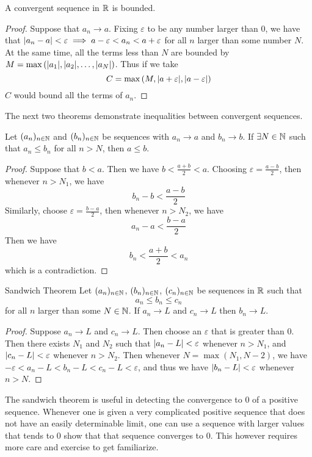 \documentclass[a4paper]{article}
\begin{document}
\begin{prp}{}{} A convergent sequence in $\mathbb{R}$ is bounded. \tcbline
\begin{proof} Suppose that $a_n\to a$. Fixing $\varepsilon$ to be any number larger than 0, we have that $\abs{a_n-a}<\varepsilon\implies a-\varepsilon<a_n<a+\varepsilon$ for all $n$ larger than some number $N$. At the same time, all the terms less than $N$ are bounded by $M=\max{(\abs{a_1}, \abs{a_2}, \dots,\abs{a_N})}$. Thus if we take $$C=\max{(M,\abs{a+\varepsilon},\abs{a-\varepsilon})}$$ $C$ would bound all the terms of $a_n$. 
\end{proof}
\end{prp}

The next two theorems demonstrate inequalities between convergent sequences. 

\begin{thm}{}{} Let $(a_n)_{n\in\mathbb{N}}$ and $(b_n)_{n\in\mathbb{N}}$ be sequences with $a_n\to a$ and $b_n\to b$. If $\exists N\in\mathbb{N}$ such that $a_n\leq b_n$ for all $n>N$, then $a\leq b$. \tcbline
\begin{proof} Suppose that $b<a$. Then we have $b<\frac{a+b}{2}<a$. Choosing $\varepsilon=\frac{a-b}{2}$, then whenever $n>N_1$, we have $$b_n-b<\frac{a-b}{2}$$ Similarly, choose $\varepsilon=\frac{b-a}{2}$, then whenever $n>N_2$, we have $$a_n-a<\frac{b-a}{2}$$ Then we have $$b_n<\frac{a+b}{2}<a_n$$ which is a contradiction. 
\end{proof}
\end{thm}

\begin{thm}{Sandwich Theorem}{} Let $(a_n)_{n\in\mathbb{N}}$, $(b_n)_{n\in\mathbb{N}}$, $(c_n)_{n\in\mathbb{N}}$ be sequences in $\mathbb{R}$ such that $$a_n\leq b_n\leq c_n$$ for all $n$ larger than some $N\in\mathbb{N}$. If $a_n\to L$ and $c_n\to L$ then $b_n\to L$. \tcbline
\begin{proof} Suppose $a_n\to L$ and $c_n\to L$. Then choose an $\varepsilon$ that is greater than $0$. Then there exists $N_1$ and $N_2$ such that $\abs{a_n-L}<\varepsilon$ whenever $n>N_1$, and $\abs{c_n-L}<\varepsilon$ whenever $n>N_2$. Then whenever $N=\max{(N_1,N-2)}$, we have $-\varepsilon<a_n-L<b_n-L<c_n-L<\varepsilon$, and thus we have $\abs{b_n-L}<\varepsilon$ whenever $n>N$. 
\end{proof}
\end{thm}

The sandwich theorem is useful in detecting the convergence to $0$ of a positive sequence. Whenever one is given a very complicated positive sequence that does not have an easily determinable limit, one can use a sequence with larger values that tends to $0$ show that that sequence converges to $0$. This however requires more care and exercise to get familiarize. \\~\\
\end{document}
